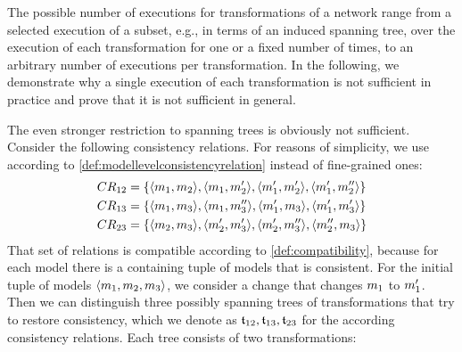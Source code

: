 The possible number of executions for transformations of a network range from a selected execution of a subset, e.g., in terms of an induced spanning tree, over the execution of each transformation for one or a fixed number of times, to an arbitrary number of executions per transformation.
In the following, we demonstrate why a single execution of each transformation is not sufficient in practice and prove that it is not sufficient in general.

The even stronger restriction to spanning trees is obviously not sufficient.
Consider the following consistency relations. For reasons of simplicity, we use \modellevelconsistencyrelations according to \autoref{def:modellevelconsistencyrelation} instead of fine-grained ones:
\begin{align*}
    & 
    CR_{12} = \{ \langle m_{1}, m_{2} \rangle, \langle m_{1}, m_{2}' \rangle, \langle m_{1}', m_{2}' \rangle, \langle m_{1}', m_{2}'' \rangle \} \\
    & 
    CR_{13} = \{ \langle m_{1}, m_{3} \rangle, \langle m_{1}, m_{3}'' \rangle, \langle m_{1}', m_{3} \rangle, \langle m_{1}', m_{3}' \rangle \} \\
    & 
    CR_{23} = \{ \langle m_{2}, m_{3} \rangle, \langle m_{2}', m_{3}' \rangle, \langle m_{2}', m_{3}'' \rangle, \langle m_{2}'', m_{3} \rangle \} 
\end{align*}
That set of relations is compatible according to \autoref{def:compatibility}, because for each model there is a containing tuple of models that is consistent.
For the initial tuple of models $\langle m_{1}, m_{2}, m_{3} \rangle$, we consider a change that changes $m_{1}$ to $m_{1}'$.
Then we can distinguish three possibly spanning trees of transformations that try to restore consistency, which we denote as $\mathfrak{t}_{12}, \mathfrak{t}_{13}, \mathfrak{t}_{23}$ for the according consistency relations.
Each tree consists of two transformations:
